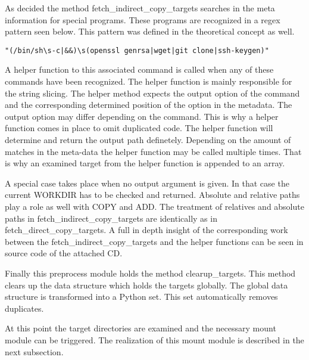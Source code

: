 As decided the method fetch\_indirect\_copy\_targets searches in the meta information for special programs. 
These programs are recognized in a regex pattern seen below. 
This pattern was defined in the theoretical concept as well.
\begin{lstlisting}
"(/bin/sh\s-c|&&)\s(openssl genrsa|wget|git clone|ssh-keygen)"
\end{lstlisting}
A helper function to this associated command is called when any of these commands have been recognized. 
The helper function is mainly responsible for the string slicing.
The helper method expects the output option of the command and the corresponding determined position of the option in the metadata.
The output option may differ depending on the command. 
This is why a helper function comes in place to omit duplicated code. 
The helper function will determine and return the output path definetely.
Depending on the amount of matches in the meta-data the helper function may be called multiple times. 
That is why an examined target from the helper function is appended to an array. 

A special case takes place when no output argument is given. 
In that case the current WORKDIR has to be checked and returned.
Absolute and relative paths play a role as well with COPY and ADD. 
The treatment of relatives and absolute paths in fetch\_indirect\_copy\_targets are identically as in fetch\_direct\_copy\_targets.
A full in depth insight of the corresponding work between the fetch\_indirect\_copy\_targets and the helper functions can be seen in source code of the attached CD.

Finally this preprocess module holds the method clearup\_targets. This method clears up the data structure which holds the targets globally. The global data structure is transformed into a Python set. This set automatically removes duplicates.
	
At this point the target directories are examined and the necessary mount module can be triggered. The realization of this mount module is described in the next subsection.

